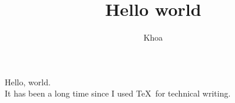 \documentclass{article}
\title {Hello world}
\author{Khoa}
\begin{document}
\maketitle

Hello, world. \\

It has been a long time since I used \TeX \, for technical writing.
\end{document}
